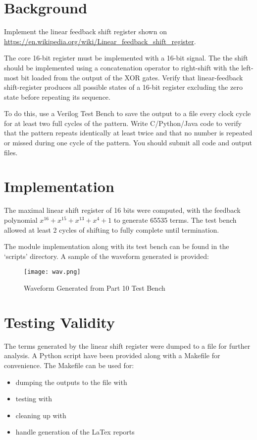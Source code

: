 \documentclass[paper=usletter, fontsize=12pt]{article}
\begin{document}
    \vspace{-0.1in}

    \section{Background}
    Implement the linear feedback shift register shown on \url{https://en.wikipedia.org/wiki/Linear_feedback_shift_register}.

    The core 16-bit register must be implemented with a 16-bit signal. The the shift should be implemented using a concatenation operator to right-shift with the left-most bit loaded from the output of the XOR gates. Verify that linear-feedback shift-register produces all possible states of a 16-bit register excluding the zero state before repeating its sequence.

    To do this, use a Verilog Test Bench to save the output to a file every clock cycle for at least two full cycles of the pattern. Write C/Python/Java code to verify that the pattern repeats identically at least twice and that no number is repeated or missed during one cycle of the pattern. You should submit all code and output files.

    \section{Implementation}
    The maximal linear shift register of 16 bits were computed, with the feedback polynomial $x^{16}+x^{15}+x^{13}+x^{4}+1$ \cite{maxpolynomial} to generate 65535 terms. The test bench allowed at least 2 cycles of shifting to fully complete until termination.

    The module implementation along with its test bench can be found in the `scripts' directory. A sample of the waveform generated is provided:

    \begin{figure}[ht]
        \begin{center}
            \texttt{[image: wav.png]}
            \caption{Waveform Generated from Part 10 Test Bench} \label{fig:wav}
        \end{center}
    \end{figure}

    \section{Testing Validity}
    The terms generated by the linear shift register were dumped to a file for further analysis. A Python script have been provided along with a Makefile for convenience. The Makefile can be used for:
    \begin{itemize}
        \item dumping the outputs to the file with 
        \item testing with 
        \item cleaning up with 
        \item handle generation of the LaTex reports
    \end{itemize}
\end{document}
